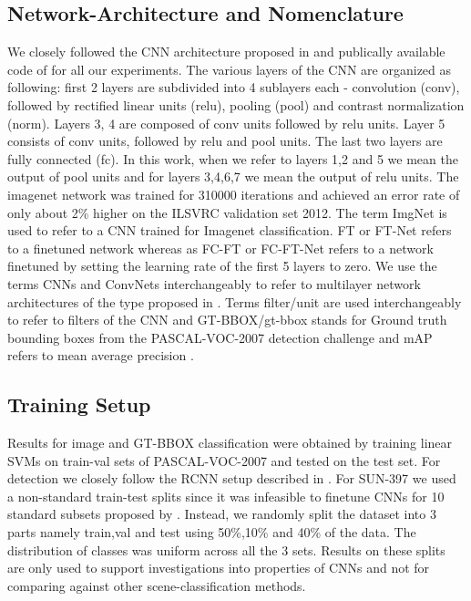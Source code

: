 \documentclass[runningheads]{llncs}
\begin{document}
\subsection{Network-Architecture and Nomenclature}
\label{sub:net-arch}
We closely followed the CNN architecture proposed in \cite{Kriz} and publically available code of \cite{caffe} for all our experiments. The various layers of the CNN are organized as following: first 2 layers are subdivided into 4 sublayers each - convolution (conv), followed by rectified linear units (relu), pooling (pool) and contrast normalization (norm). Layers 3, 4 are composed of conv units followed by relu units. Layer 5 consists of conv units, followed by relu and pool units. The last two layers are fully connected (fc). In this work, when we refer to layers 1,2 and 5 we mean the output of pool units and for layers 3,4,6,7 we mean the output of relu units. The imagenet network was trained for 310000 iterations and achieved an error rate of only about 2\% higher on the ILSVRC validation set 2012. \newline
The term ImgNet is used to refer to a CNN trained for Imagenet classification. FT or FT-Net refers to a finetuned network whereas as FC-FT or FC-FT-Net refers to a network finetuned by setting the learning rate of the first 5 layers to zero. We use the terms CNNs and ConvNets interchangeably to refer to multilayer network architectures of the type proposed in \cite{Kriz}. Terms filter/unit are used interchangeably to refer to filters of the CNN and GT-BBOX/gt-bbox stands for Ground truth bounding boxes from the PASCAL-VOC-2007 detection challenge and mAP refers to mean average precision \cite{Pascal}.

\subsection{Training Setup} 
\label{sub:train-setup}
Results for image and GT-BBOX classification were obtained by training linear SVMs on train-val sets of PASCAL-VOC-2007 \cite{Pascal} and tested on the test set. For detection we closely follow the RCNN setup described in \cite{Rcnn}. For SUN-397 \cite{sun} we used a non-standard train-test splits since it was infeasible to finetune CNNs for 10 standard subsets proposed by \cite{sun}. Instead, we randomly split the dataset into 3 parts namely train,val and test using 50\%,10\% and 40\% of the data. The distribution of classes was uniform across all the 3 sets. Results on these splits are only used to support investigations into properties of CNNs and not for comparing against other scene-classification methods.  
 
\end{document}
